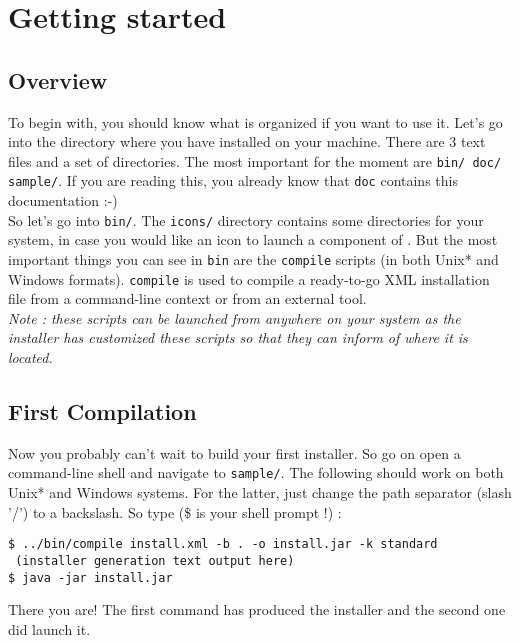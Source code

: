 \chapter{Getting started}

\section{Overview}

To begin with, you should know what \IzPack is organized if you want to use
it. Let's go into the directory where you have installed \IzPack on your
machine. There are 3 text files and a set of directories. The most
important for the moment are \texttt{bin/ doc/ sample/}. If you are reading this,
you already know that \texttt{doc} contains this documentation :-)\\

So let's go into \texttt{bin/}. The \texttt{icons/} directory contains some
directories for your system, in case you would like an icon to launch a
component of \IzPack. But the most important things you can see in \texttt{bin}
are the \texttt{compile} scripts (in both Unix* and Windows formats).
\texttt{compile} is used to compile a ready-to-go XML installation file from
a command-line context or from an external tool.\\

\noindent
\textit{Note : these scripts can be launched from anywhere on your system as the
installer has customized these scripts so that they can inform \IzPack of where
it is located.}\\

\section{First Compilation}

Now you probably can't wait to build your first installer. So go on open a
command-line shell and navigate to \texttt{sample/}. The following should work
on both Unix* and Windows systems. For the latter, just change the path
separator (slash '/') to a backslash. So type (\$ is your shell prompt !) :
\begin{verbatim}
$ ../bin/compile install.xml -b . -o install.jar -k standard
 (installer generation text output here)
$ java -jar install.jar
\end{verbatim}

There you are! The first command has produced the installer and the
second one did launch it.


